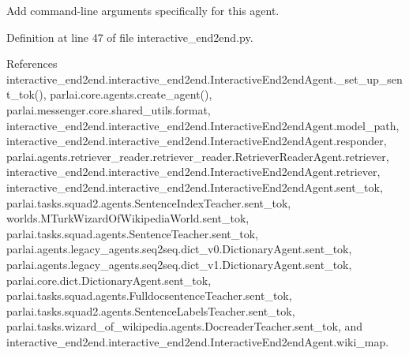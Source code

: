 \begin{DoxyVerb}Add command-line arguments specifically for this agent.\end{DoxyVerb}
 

Definition at line 47 of file interactive\+\_\+end2end.\+py.



References interactive\+\_\+end2end.\+interactive\+\_\+end2end.\+Interactive\+End2end\+Agent.\+\_\+set\+\_\+up\+\_\+sent\+\_\+tok(), parlai.\+core.\+agents.\+create\+\_\+agent(), parlai.\+messenger.\+core.\+shared\+\_\+utils.\+format, interactive\+\_\+end2end.\+interactive\+\_\+end2end.\+Interactive\+End2end\+Agent.\+model\+\_\+path, interactive\+\_\+end2end.\+interactive\+\_\+end2end.\+Interactive\+End2end\+Agent.\+responder, parlai.\+agents.\+retriever\+\_\+reader.\+retriever\+\_\+reader.\+Retriever\+Reader\+Agent.\+retriever, interactive\+\_\+end2end.\+interactive\+\_\+end2end.\+Interactive\+End2end\+Agent.\+retriever, interactive\+\_\+end2end.\+interactive\+\_\+end2end.\+Interactive\+End2end\+Agent.\+sent\+\_\+tok, parlai.\+tasks.\+squad2.\+agents.\+Sentence\+Index\+Teacher.\+sent\+\_\+tok, worlds.\+M\+Turk\+Wizard\+Of\+Wikipedia\+World.\+sent\+\_\+tok, parlai.\+tasks.\+squad.\+agents.\+Sentence\+Teacher.\+sent\+\_\+tok, parlai.\+agents.\+legacy\+\_\+agents.\+seq2seq.\+dict\+\_\+v0.\+Dictionary\+Agent.\+sent\+\_\+tok, parlai.\+agents.\+legacy\+\_\+agents.\+seq2seq.\+dict\+\_\+v1.\+Dictionary\+Agent.\+sent\+\_\+tok, parlai.\+core.\+dict.\+Dictionary\+Agent.\+sent\+\_\+tok, parlai.\+tasks.\+squad.\+agents.\+Fulldocsentence\+Teacher.\+sent\+\_\+tok, parlai.\+tasks.\+squad2.\+agents.\+Sentence\+Labels\+Teacher.\+sent\+\_\+tok, parlai.\+tasks.\+wizard\+\_\+of\+\_\+wikipedia.\+agents.\+Docreader\+Teacher.\+sent\+\_\+tok, and interactive\+\_\+end2end.\+interactive\+\_\+end2end.\+Interactive\+End2end\+Agent.\+wiki\+\_\+map.

